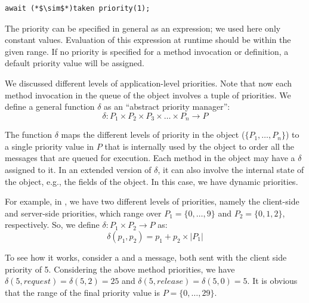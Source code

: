 \begin{lstlisting}[frame=none, numbers=none]
await (*$\sim$*)taken priority(1);
\end{lstlisting}


The priority can be specified in general as an expression; we used here
only constant values.
Evaluation of this expression at runtime should be within the given
range.
If no priority is specified for a method invocation or definition, a
default priority value will be assigned.

% 

We discussed different levels of application-level priorities. 
Note that now each method invocation in
the queue of the object involves a tuple of priorities.
We define a general function $\delta$ as an ``abstract priority manager'':
%
\[ \delta : P_1 \times P_2 \times P_3 \times \ldots \times P_n \longrightarrow  P \]

The function $\delta$ maps the different levels of priority in the object
($\{P_1,\ldots,P_n\}$) to a single priority value in $P$ that is internally used by the
object to order all the messages that are queued for execution. Each
method in the object may have a $\delta$ assigned to it. In an extended
version of $\delta$, it can also involve the internal state of the object,
e.g., the fields of the object. 
In this case, we have dynamic priorities.

For example, in {}, we have two different levels of priorities, namely  the client-side and server-side priorities, which range over $P_1 = \{0, \ldots, 9\}$ and $P_2 = \{0, 1, 2\}$, respectively. 
So, we define $\delta: P_1 \times P_2 \rightarrow P$ as:
%
\[
\delta(p_1, p_2) = p_1 + p_2 \times |P_1|
\]

To see how it works, consider a  and a  message, both sent with the client side priority of 5. 
Considering the above method priorities, we have $\delta(5, request) = \delta(5,2) = 25$ and  $\delta(5, release) = \delta(5,0) = 5$.
It is obvious that the range of the final priority value is $P = \{0,\ldots,29\}$.

